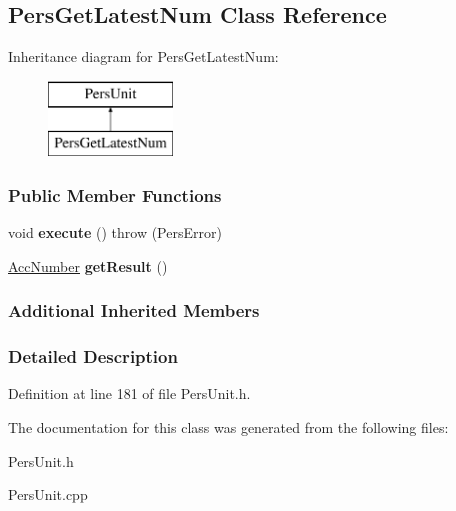 \hypertarget{classPersGetLatestNum}{\subsection{Pers\-Get\-Latest\-Num Class Reference}
\label{df/dec/classPersGetLatestNum}
}
Inheritance diagram for Pers\-Get\-Latest\-Num\-:\begin{figure}[H]
\begin{center}
\leavevmode
\includegraphics[height=2.000000cm]{df/dec/classPersGetLatestNum}
\end{center}
\end{figure}
\subsubsection*{Public Member Functions}
\begin{DoxyCompactItemize}
\item 
\hypertarget{classPersGetLatestNum_adf7f74e302ac82728b168e28d973ea3e}{void {\bfseries execute} ()  throw (\-Pers\-Error)}\label{df/dec/classPersGetLatestNum_adf7f74e302ac82728b168e28d973ea3e}

\item 
\hypertarget{classPersGetLatestNum_a93913c122245476bdc1cf0dfe1b94c6f}{\hyperlink{classAccNumber}{Acc\-Number} {\bfseries get\-Result} ()}\label{df/dec/classPersGetLatestNum_a93913c122245476bdc1cf0dfe1b94c6f}

\end{DoxyCompactItemize}
\subsubsection*{Additional Inherited Members}


\subsubsection{Detailed Description}


Definition at line 181 of file Pers\-Unit.\-h.



The documentation for this class was generated from the following files\-:\begin{DoxyCompactItemize}
\item 
Pers\-Unit.\-h\item 
Pers\-Unit.\-cpp\end{DoxyCompactItemize}
